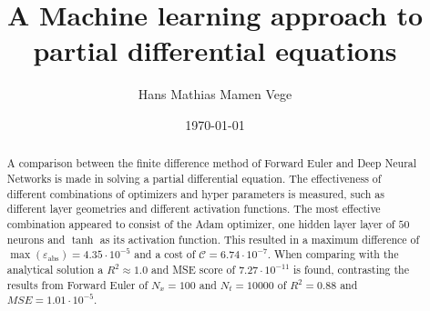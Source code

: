 \documentclass[11pt]{article}
\title{A Machine learning approach to partial differential equations}
\author{Hans Mathias Mamen Vege}
\date{\today}
\begin{document}
\maketitle

\begin{abstract}
A comparison between the finite difference method of Forward Euler and Deep Neural Networks is made in solving a partial differential equation. The effectiveness of different combinations of optimizers and hyper parameters is measured, such as different layer geometries and different activation functions. The most effective combination appeared to consist of the Adam optimizer, one hidden layer layer of $50$ neurons and $\tanh$ as its activation function. This resulted in a maximum difference of $\max(\varepsilon_\mathrm{abs})=4.35\cdot 10^{-5}$ and a cost of $\mathcal{C} = 6.74 \cdot 10^{-7}$. When comparing with the analytical solution a $R^2 \approx 1.0$ and MSE score of $7.27\cdot 10^{-11}$ is found, contrasting the results from Forward Euler of $N_x=100$ and $N_t=10000$ of $R^2=0.88$ and $MSE=1.01\cdot 10^{-5}$.
\end{abstract}


















\end{document}
